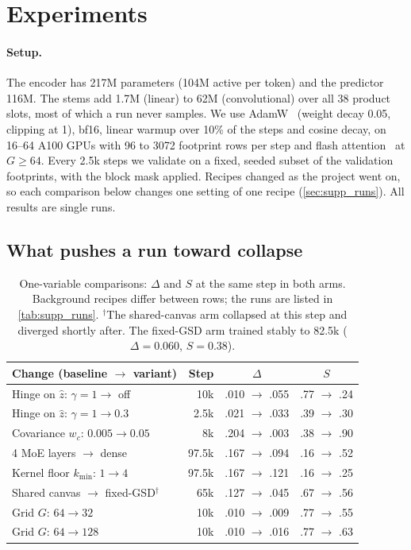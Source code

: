 \section{Experiments}
\label{sec:experiments}

\paragraph{Setup.} The encoder has 217M parameters (104M active per token) and the predictor 116M. The stems add 1.7M (linear) to 62M (convolutional) over all 38 product slots, most of which a run never samples. We use AdamW~\cite{loshchilov2019decoupled} (weight decay 0.05, clipping at 1), bf16, linear warmup over 10\% of the steps and cosine decay, on 16--64 A100 GPUs with 96 to 3072 footprint rows per step and flash attention~\cite{dao2022flashattention} at $G{\geq}64$. Every 2.5k steps we validate on a fixed, seeded subset of the validation footprints, with the block mask applied. Recipes changed as the project went on, so each comparison below changes one setting of one recipe (\cref{sec:supp_runs}). All results are single runs.

\subsection{What pushes a run toward collapse}
\label{sec:ablations}

\begin{table}[t]
  \centering
  \footnotesize
  \setlength{\tabcolsep}{2.5pt}
  \caption{One-variable comparisons: $\Delta$ and $S$ at the same step in both arms. Background recipes differ between rows; the runs are listed in \cref{tab:supp_runs}. $^\dagger$The shared-canvas arm collapsed at this step and diverged shortly after. The fixed-GSD arm trained stably to 82.5k ($\Delta{=}0.060$, $S{=}0.38$).}
  \label{tab:ablations}
  \begin{tabular}{@{}lrcc@{}}
    \toprule
    Change (baseline $\to$ variant) & Step & $\Delta$ & $S$ \\
    \midrule
    Hinge on $\hat z$: $\gamma{=}1\to$ off        & 10k   & .010 $\to$ .055 & .77 $\to$ .24 \\
    Hinge on $\hat z$: $\gamma{=}1\to0.3$         & 2.5k  & .021 $\to$ .033 & .39 $\to$ .30 \\
    Covariance $w_c$: $0.005\to0.05$              & 8k    & .204 $\to$ .003 & .38 $\to$ .90 \\
    4 MoE layers $\to$ dense                      & 97.5k & .167 $\to$ .094 & .16 $\to$ .52 \\
    Kernel floor $k_{\min}$: $1\to4$              & 97.5k & .167 $\to$ .121 & .16 $\to$ .25 \\
    Shared canvas $\to$ fixed-GSD$^\dagger$       & 65k   & .127 $\to$ .045 & .67 $\to$ .56 \\
    Grid $G$: $64\to32$                                & 10k   & .010 $\to$ .009 & .77 $\to$ .55 \\
    Grid $G$: $64\to128$                               & 10k   & .010 $\to$ .016 & .77 $\to$ .63 \\
    \bottomrule
  \end{tabular}
\end{table}

